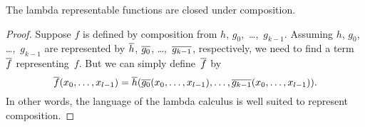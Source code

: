 \documentclass[../../include/open-logic-section]{subfiles}
\begin{document}

\begin{lem}
The lambda representable functions are closed under composition.
\end{lem}

\begin{proof}
Suppose $f$ is defined by composition from $h$, $g_0,$
\dots,~$g_{k-1}$. Assuming $h$, $g_0$, \dots,~$g_{k-1}$ are
represented by $\overline{h}$, $\overline{g_0}$, \dots,~$\overline{g_{k-1}}$,
respectively, we need to find a term~$\overline{f}$ representing~$f$. But we
can simply define~$\overline{f}$ by
\[
\overline{f}(x_0, \dots, x_{l-1}) = \overline{h}(\overline{g_0}(x_0, \dots, x_{l-1}),
\dots, \overline{g_{k-1}}(x_0, \dots, x_{l-1})).
\]
In other words, the language of the lambda calculus is well suited to
represent composition.
\end{proof}
\end{document}
